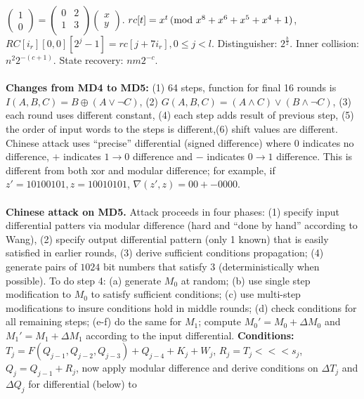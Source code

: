 $
\left(
\begin{array}{c}
1 \\
0
\end{array}
\right)=
\left(
\begin{array}{cc}
0 & 2 \\
1 & 3 \\
\end{array}
\right)
\left(
\begin{array}{c}
x \\
y
\end{array}
\right)
$.  $rc[t]= x^t \thinspace \textnormal{(mod } x^8+x^6+x^5+x^4+1 \textnormal{)}$, $RC[i_r][0,0][2^j-1]= rc[j+7i_r], 0 \leq j <l$.
Distinguisher: $2^{\frac b 2}$.
Inner collision: $n^2 2^{-(c+1)}$.
State recovery: $n m 2^{-c}$.
\\
\\
{\bf Changes from MD4 to MD5:} (1) 64 steps, function for final 16 rounds is
$I(A,B,C)= B \oplus (A \vee \neg C)$, (2) $G(A,B,C)= (A \wedge C) \vee (B \wedge \neg C)$,
(3) each round uses different constant, (4) each step adds result of previous step,
(5) the order of input words to the steps is different,(6) shift values are different.
Chinese attack uses ``precise'' differential (signed difference) where $0$ indicates no difference,
$+$ indicates $1 \rightarrow 0$ difference and
$-$ indicates $0 \rightarrow 1$ difference.
This is different from both xor and modular difference; for example,
if $z'= 10100101, z= 10010101$, $\nabla(z', z)= 00+-0000$.
\\
\\
{\bf Chinese attack on MD5.}  Attack proceeds in four
phases: (1) specify input differential patters via modular difference (hard and
``done by hand'' according to Wang), (2) specify output differential pattern (only 1 known)
that is easily satisfied in earlier rounds, (3) derive sufficient conditions propagation;
(4) generate pairs of $1024$ bit numbers that satisfy 3 (deterministically when possible).
To do step 4: (a) generate $M_0$ at random; (b) use single step modification to
$M_0$ to satisfy sufficient conditions; (c) use multi-step modifications to insure
conditions hold in middle rounds; (d) check conditions for all remaining steps; (e-f)
do the same for $M_1$; compute $M_0'= M_0 + \Delta M_0$ and
$M_1'= M_1 + \Delta M_1$ according to the input differential.  
{\bf Conditions:}  $T_j= F( Q_{j-1}, Q_{j-2}, Q_{j-3}) + Q_{j-4} + K_j + W_j$, 
$R_j= T_j <<< s_j$, $Q_j= Q_{j-1} + R_j$, now apply modular difference and
derive conditions on $\Delta T_j$ and $\Delta Q_j$ for differential (below) to
